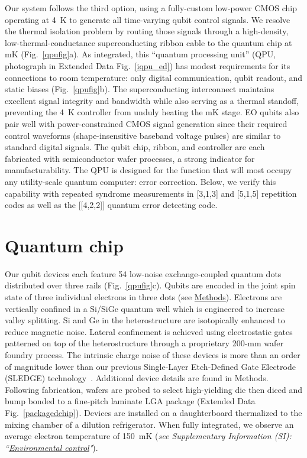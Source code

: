 \documentclass[aps,prl,twocolumn,superscriptaddress,nobibnotes,10pt,floatfix]{revtex4-2}
\newcommand{\figsubref}[2]{Fig.~\ref{#1}{#2}}
\newcommand{\efigref}[2]{Extended Data Fig.~\ref{#1}}
\newcommand{\firstSIlink}[2]{\textit{see Supplementary Information (SI): ``\hyperref[#2]{#1}"}}
\begin{document}
	Our system follows the third option, using a fully-custom low-power CMOS chip operating at 4~K to generate all time-varying qubit control signals.
	We resolve the thermal isolation problem by routing those signals through a high-density, low-thermal-conductance superconducting ribbon cable to the quantum chip at mK (\figsubref{qpufig}{a}).
	As integrated, this ``quantum processing unit'' (QPU, photograph in \efigref{iqpu_ed} \ ) has modest requirements for its connections to room temperature: only digital communication, qubit readout, and static biases (\figsubref{qpufig}{b}).
	The superconducting interconnect maintains excellent signal integrity and bandwidth while also serving as a thermal standoff, preventing the 4~K controller from unduly heating the mK stage.
	EO qubits also pair well with power-constrained CMOS signal generation since their required control waveforms (shape-insensitive baseband voltage pulses) are similar to standard digital signals.
	The qubit chip, ribbon, and controller are each fabricated with semiconductor wafer processes, a strong indicator for manufacturability.
	The QPU is designed for the function that will most occupy any utility-scale quantum computer: error correction.
	Below, we verify this capability with repeated syndrome measurements in {[}3,1,3{]} and {[}5,1,5{]} repetition codes as well as the {[}{[}4,2,2{]}{]} quantum error detecting code.

	\section{Quantum chip}\label{quantum-chip}

	Our qubit devices each feature 54 low-noise exchange-coupled quantum dots distributed over three rails (\figsubref{qpufig}{c}).
	Qubits are encoded in the joint spin state of three individual electrons in three dots (see \hyperref[methods-section]{Methods}).
	Electrons are vertically confined in a Si/SiGe quantum well which is engineered to increase valley splitting.
	Si and Ge in the heterostructure are isotopically enhanced to reduce magnetic noise.
	Lateral confinement is achieved using electrostatic gates patterned on top of the heterostructure through a proprietary 200-mm wafer foundry process.
	The intrinsic charge noise of these devices is more than an order of magnitude lower than our previous Single-Layer Etch-Defined Gate Electrode (SLEDGE) technology~\cite{ha_flexible_2022,weinstein_universal_2023,ha_two-dimensional_2025}.
	Additional device details are found in Methods.
	Following fabrication, wafers are probed to select high-yielding die then diced and bump bonded to a fine-pitch laminate LGA package (\efigref{packagedchip} \ ).
	Devices are installed on a daughterboard thermalized to the mixing chamber of a dilution refrigerator.
	When fully integrated, we observe an average electron temperature of 150~mK (\firstSIlink{Environmental control}{environmental-control}).
\end{document}
